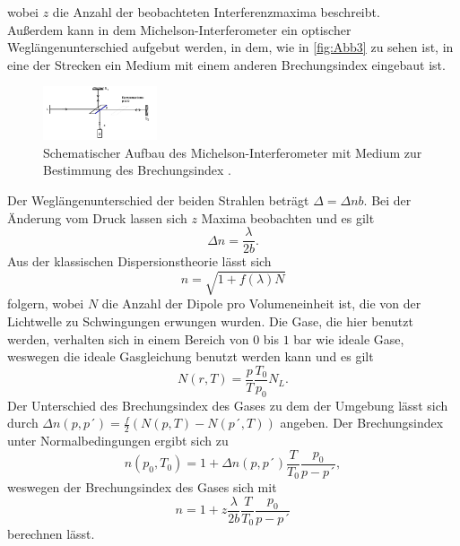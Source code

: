 wobei $z$ die Anzahl der beobachteten Interferenzmaxima beschreibt.\\
Außerdem kann in dem Michelson-Interferometer ein optischer Weglängenunterschied aufgebut werden, in dem, wie in \autoref{fig:Abb3} zu sehen ist,
in eine der Strecken ein Medium mit einem anderen Brechungsindex eingebaut ist.
\begin{figure}[H]
    \centering
    \includegraphics[width=0.3\textwidth]{build/Abb4.PNG}
    \caption {Schematischer Aufbau des Michelson-Interferometer mit Medium zur Bestimmung des Brechungsindex \cite[3]{V401}.}
    \label{fig:Abb4}
\end{figure}
Der Weglängenunterschied der beiden Strahlen beträgt $\Delta = \Delta n b$. 
Bei der Änderung vom Druck lassen sich $z$ Maxima beobachten und es gilt
\begin{equation}
    \Delta n =\frac{\lambda}{2b}.
    \label{eqn:Delta_n}
\end{equation}
Aus der klassischen Dispersionstheorie lässt sich
\begin{equation*}
    n = \sqrt{1 + f(\lambda)N}
\end{equation*}
folgern, wobei $N$ die Anzahl der Dipole pro Volumeneinheit ist, die von der Lichtwelle zu Schwingungen erwungen wurden.
Die Gase, die hier benutzt werden, verhalten sich in einem Bereich von $0$ bis $1$ bar wie ideale Gase, weswegen die ideale Gasgleichung benutzt werden kann und es gilt
\begin{equation*}
    N(r,T) = \frac{p}{T}\frac{T_0}{p_0}N_L.
\end{equation*}
Der Unterschied des Brechungsindex des Gases zu dem der Umgebung lässt sich durch $\Delta n(p,p´) = \frac{f}{2}(N(p,T)-N(p´,T))$ angeben.
Der Brechungsindex unter Normalbedingungen ergibt sich zu 
\begin{equation}
    n(p_0,T_0) = 1 + \Delta n(p,p´)\frac{T}{T_0}\frac{p_0}{p-p´},
    \label{eqn:Normalbedingungen}
\end{equation}
weswegen der Brechungsindex des Gases sich mit
\begin{equation}
    n = 1 + z \frac{\lambda}{2b} \frac{T}{T_0} \frac{p_0}{p-p´}
    \label{eqn:n}
\end{equation}
berechnen lässt.
